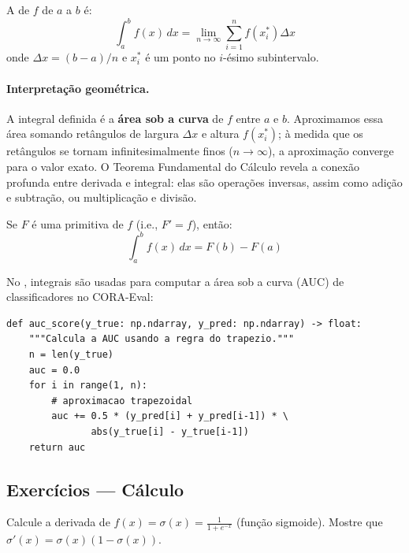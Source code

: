 \begin{definicao}
    A  de $f$ de $a$ a $b$ é:
    \[
    \int_a^b f(x) \, dx = \lim_{n \to \infty}
    \sum_{i=1}^{n} f(x_i^*) \Delta x
    \]
    onde $\Delta x = (b-a)/n$ e $x_i^*$ é um ponto no $i$-ésimo subintervalo.
\end{definicao}

\paragraph{Interpretação geométrica.} A integral definida é a \textbf{área
sob a curva} de $f$ entre $a$ e $b$. Aproximamos essa área somando
retângulos de largura $\Delta x$ e altura $f(x_i^*)$; à medida que os
retângulos se tornam infinitesimalmente finos ($n \to \infty$), a
aproximação converge para o valor exato. O Teorema Fundamental do Cálculo
revela a conexão profunda entre derivada e integral: elas são operações
inversas, assim como adição e subtração, ou multiplicação e divisão.

\begin{teorema}
    Se $F$ é uma primitiva de $f$ (i.e., $F' = f$), então:
    \[
    \int_a^b f(x) \, dx = F(b) - F(a)
    \]
\end{teorema}

\begin{exemplo}
    No \opencodeeco{}, integrais são usadas para computar a área sob a curva
    (AUC) de classificadores no CORA-Eval:
    \begin{lstlisting}[style=pythonstyle]
def auc_score(y_true: np.ndarray, y_pred: np.ndarray) -> float:
    """Calcula a AUC usando a regra do trapezio."""
    n = len(y_true)
    auc = 0.0
    for i in range(1, n):
        # aproximacao trapezoidal
        auc += 0.5 * (y_pred[i] + y_pred[i-1]) * \
               abs(y_true[i] - y_true[i-1])
    return auc
    \end{lstlisting}
\end{exemplo}

\subsection{Exercícios — Cálculo}

\begin{exercicio}
    Calcule a derivada de $f(x) = \sigma(x) = \frac{1}{1 + e^{-x}}$
    (função sigmoide). Mostre que $\sigma'(x) = \sigma(x)(1 - \sigma(x))$.
\end{exercicio}

